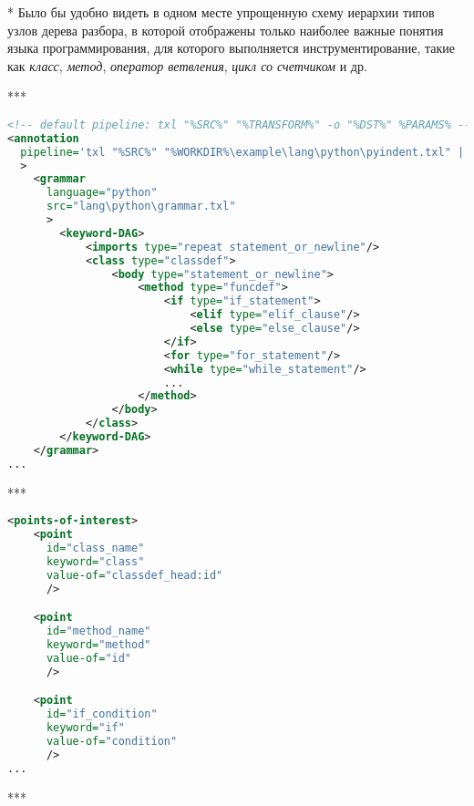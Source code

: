 * Было бы удобно видеть в одном месте упрощенную схему иерархии типов узлов дерева разбора, в которой отображены только наиболее важные понятия языка программирования, для которого выполняется инструментирование, такие как \textit{класс}, \textit{метод}, \textit{оператор ветвления}, \textit{цикл со счетчиком} и др.

***

\begin{lstlisting}[frame=single, language=XML, label={annotation-dag-example}, caption={Пример}]
<!-- default pipeline: txl "%SRC%" "%TRANSFORM%" -o "%DST%" %PARAMS% -->
<annotation
  pipeline='txl "%SRC%" "%WORKDIR%\example\lang\python\pyindent.txl" | txl stdin "%TRANSFORM%" -o "%DST%" %PARAMS%'
  >
    <grammar
      language="python"
      src="lang\python\grammar.txl"
      >
        <keyword-DAG>
            <imports type="repeat statement_or_newline"/>
            <class type="classdef">
                <body type="statement_or_newline">
                    <method type="funcdef">
                        <if type="if_statement">
                            <elif type="elif_clause"/>
                            <else type="else_clause"/>
                        </if>
                        <for type="for_statement"/>
                        <while type="while_statement"/>
                        ...
                    </method>
                </body>
            </class>
        </keyword-DAG>
    </grammar>
...
\end{lstlisting}

***

\begin{lstlisting}[frame=single, language=XML, label={annotation-pois-example}, caption={Пример}]
<points-of-interest>
    <point
      id="class_name"
      keyword="class"
      value-of="classdef_head:id"
      />

    <point
      id="method_name"
      keyword="method"
      value-of="id"
      />

    <point
      id="if_condition"
      keyword="if"
      value-of="condition"
      />
...
\end{lstlisting}

***

